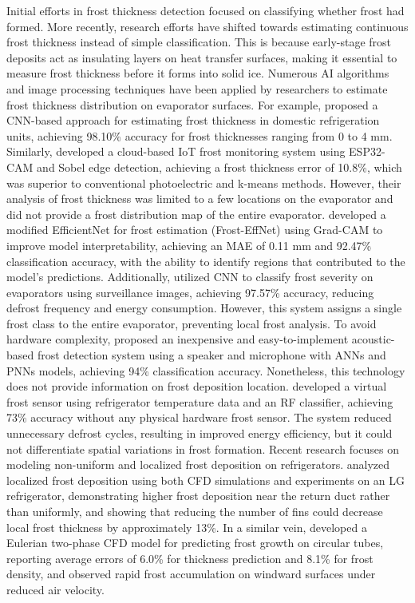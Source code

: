 \documentclass[a4paper,fleqn]{cas-dc}
\begin{document}
Initial efforts in frost thickness detection focused on classifying whether frost had formed. More recently, research efforts have shifted towards estimating continuous frost thickness instead of simple classification. This is because early-stage frost deposits act as insulating layers on heat transfer surfaces, making it essential to measure frost thickness before it forms into solid ice. Numerous AI algorithms and image processing techniques have been applied by researchers to estimate frost thickness distribution on evaporator surfaces. For example, \citet{akbar2024deep} proposed a CNN-based approach for estimating frost thickness in domestic refrigeration units, achieving 98.10\% accuracy for frost thicknesses ranging from 0 to 4 mm. Similarly, \citet{rahman2023cloud} developed a cloud-based IoT frost monitoring system using ESP32-CAM and Sobel edge detection, achieving a frost thickness error of 10.8\%, which was superior to conventional photoelectric and k-means methods. However, their analysis of frost thickness was limited to a few locations on the evaporator and did not provide a frost distribution map of the entire evaporator. \citet{mehmood2025frost} developed a modified EfficientNet for frost estimation (Frost-EffNet) using Grad-CAM to improve model interpretability, achieving an MAE of 0.11 mm and 92.47\% classification accuracy, with the ability to identify regions that contributed to the model's predictions. Additionally, \citet{chen2024utilizing} utilized CNN to classify frost severity on evaporators using surveillance images, achieving 97.57\% accuracy, reducing defrost frequency and energy consumption. However, this system assigns a single frost class to the entire evaporator, preventing local frost analysis. To avoid hardware complexity, \citet{andrade2025acoustic} proposed an inexpensive and easy-to-implement acoustic-based frost detection system using a speaker and microphone with ANNs and PNNs models, achieving 94\% classification accuracy. Nonetheless, this technology does not provide information on frost deposition location. \citet{alcaraz2023virtual} developed a virtual frost sensor using refrigerator temperature data and an RF classifier, achieving 73\% accuracy without any physical hardware frost sensor. The system reduced unnecessary defrost cycles, resulting in improved energy efficiency, but it could not differentiate spatial variations in frost formation. Recent research focuses on modeling non-uniform and localized frost deposition on refrigerators. \citet{babadi2023localized} analyzed localized frost deposition using both CFD simulations and experiments on an LG refrigerator, demonstrating higher frost deposition near the return duct rather than uniformly, and showing that reducing the number of fins could decrease local frost thickness by approximately 13\%. In a similar vein, \citet{wang2023eulerian} developed a Eulerian two-phase CFD model for predicting frost growth on circular tubes, reporting average errors of 6.0\% for thickness prediction and 8.1\% for frost density, and observed rapid frost accumulation on windward surfaces under reduced air velocity.
\end{document}
